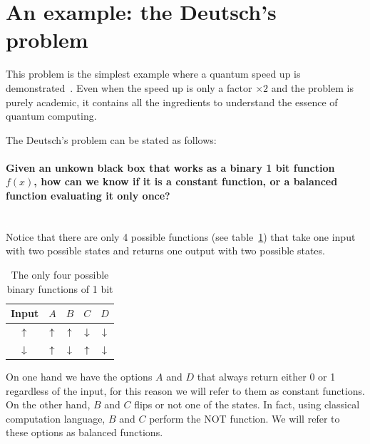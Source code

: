 \section{An example: the Deutsch's problem}
This problem is the simplest example where a quantum speed up is demonstrated~\cite{Deutsch1992}. Even when the speed up is only a factor $\times2$ and the problem is purely academic, it contains all the ingredients to understand the essence of quantum computing.

The Deutsch's problem can be stated as follows:

\paragraph{Given an unkown black box that works as a binary 1 bit function $f(x)$, how can we know if it is a constant function, or a balanced function evaluating it only once?\\}
\textcolor{white}{.}\\
Notice that there are only 4 possible functions (see table~\ref{binfunc}) that take one input with two possible states and returns one output with two possible states.
\begin{table}[h!]
\begin{center}
\begin{tabular}{c|c|c|c|c}
\multicolumn{1}{l|}{Input} & \multicolumn{1}{l|}{$A$} & \multicolumn{1}{l|}{$B$} & \multicolumn{1}{l|}{$C$} & \multicolumn{1}{l}{$D$} \\ \hline
$\uparrow$ & $\uparrow$ & $\uparrow$ & $\downarrow$ & $\downarrow$ \\ %
$\downarrow$ & $\uparrow$ & $\downarrow$ & $\uparrow$ & $\downarrow$ \\ %
\end{tabular}
\end{center}
\vspace{-15pt}\caption{The only four possible binary functions of 1 bit}
\label{binfunc}
\end{table}

On one hand we have the options $A$ and $D$ that always return either 0 or 1 regardless of the input, for this reason we will refer to them as constant functions.
On the other hand, $B$ and $C$ flips or not one of the states. In fact, using classical computation language, $B$ and $C$ perform the NOT function. We will refer to these options as balanced functions.\\

